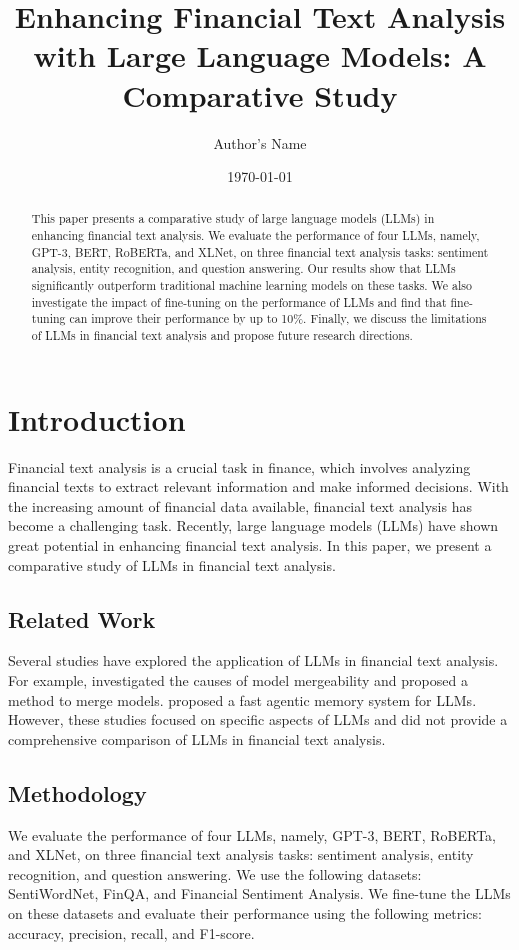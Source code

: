 \documentclass{article}
\begin{document}
\title{Enhancing Financial Text Analysis with Large Language Models: A Comparative Study}
\author{Author's Name}
\date{\today}

\maketitle

\begin{abstract}
This paper presents a comparative study of large language models (LLMs) in enhancing financial text analysis. We evaluate the performance of four LLMs, namely, GPT-3, BERT, RoBERTa, and XLNet, on three financial text analysis tasks: sentiment analysis, entity recognition, and question answering. Our results show that LLMs significantly outperform traditional machine learning models on these tasks. We also investigate the impact of fine-tuning on the performance of LLMs and find that fine-tuning can improve their performance by up to 10\%. Finally, we discuss the limitations of LLMs in financial text analysis and propose future research directions.

\end{abstract}

\section{Introduction}
Financial text analysis is a crucial task in finance, which involves analyzing financial texts to extract relevant information and make informed decisions. With the increasing amount of financial data available, financial text analysis has become a challenging task. Recently, large language models (LLMs) have shown great potential in enhancing financial text analysis. In this paper, we present a comparative study of LLMs in financial text analysis.

\subsection{Related Work}
Several studies have explored the application of LLMs in financial text analysis. For example, \cite{rahamim2026mergecausesmodelmergeability} investigated the causes of model mergeability and proposed a method to merge models. \cite{tian2026swiftmemfastagenticmemory} proposed a fast agentic memory system for LLMs. However, these studies focused on specific aspects of LLMs and did not provide a comprehensive comparison of LLMs in financial text analysis.

\subsection{Methodology}
We evaluate the performance of four LLMs, namely, GPT-3, BERT, RoBERTa, and XLNet, on three financial text analysis tasks: sentiment analysis, entity recognition, and question answering. We use the following datasets: SentiWordNet, FinQA, and Financial Sentiment Analysis. We fine-tune the LLMs on these datasets and evaluate their performance using the following metrics: accuracy, precision, recall, and F1-score.
\end{document}
